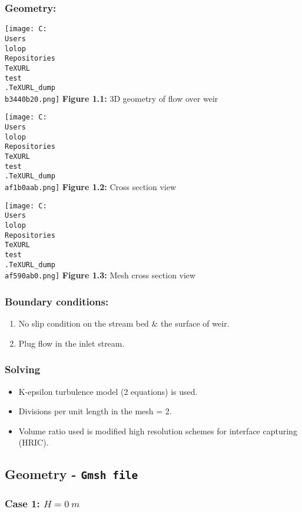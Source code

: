 \documentclass[11pt]{article}
\providecommand{\tightlist}{%
      \setlength{\itemsep}{0pt}\setlength{\parskip}{0pt}}
\begin{document}
\hypertarget{geometry}{%
\subsubsection{Geometry:}\label{geometry}}

\texttt{[image: C:\\Users\\lolop\\Repositories\\TeXURL\\test\\.TeXURL\_dump\\b3440b20.png]} \textbf{Figure 1.1:}
3D geometry of flow over weir

\texttt{[image: C:\\Users\\lolop\\Repositories\\TeXURL\\test\\.TeXURL\_dump\\af1b0aab.png]} \textbf{Figure 1.2:}
Cross section view

\texttt{[image: C:\\Users\\lolop\\Repositories\\TeXURL\\test\\.TeXURL\_dump\\af590ab0.png]} \textbf{Figure 1.3:}
Mesh cross section view

\hypertarget{boundary-conditions}{%
\subsubsection{Boundary conditions:}\label{boundary-conditions}}

\begin{enumerate}
\def\labelenumi{\arabic{enumi}.}
\tightlist
\item
  No slip condition on the stream bed \& the surface of weir.
\item
  Plug flow in the inlet stream.
\end{enumerate}

\hypertarget{solving}{%
\subsubsection{Solving}\label{solving}}

\begin{itemize}
\tightlist
\item
  K-epsilon turbulence model (2 equations) is used.
\item
  Divisions per unit length in the mesh = 2.
\item
  Volume ratio used is modified high resolution schemes for interface
  capturing (HRIC).
\end{itemize}

\hypertarget{geometry---gmsh-file}{%
\subsection{\texorpdfstring{Geometry -
\texttt{Gmsh\ file}}{Geometry - Gmsh file}}\label{geometry---gmsh-file}}

\hypertarget{case-1-h-0-m}{%
\subsubsection{\texorpdfstring{Case 1:
\(H = 0\ m\)}{Case 1: H = 0\textbackslash{} m}}\label{case-1-h-0-m}}
\end{document}

